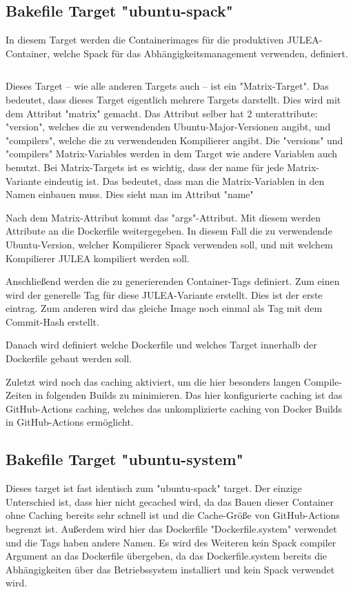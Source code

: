 \subsection{Bakefile Target "ubuntu-spack"}

In diesem Target werden die Containerimages für die produktiven JULEA-Container, welche Spack für das Abhängigkeitsmanagement verwenden, definiert.

\inputminted[firstline=9,lastline=33]{./lexers/docker-bake-lexer.py}{./code-examples/docker-bake.hcl}

Dieses Target – wie alle anderen Targets auch – ist ein "Matrix-Target". Das bedeutet, dass dieses Target eigentlich mehrere Targets darstellt. Dies wird mit dem Attribut "matrix" gemacht. Das Attribut selber hat 2 unterattribute: "version", welches die zu verwendenden Ubuntu-Major-Versionen angibt, und "compilers", welche die zu verwendenden Kompilierer angibt.
Die "versions" und "compilers" Matrix-Variables werden in dem Target wie andere Variablen auch benutzt. 
Bei Matrix-Targets ist es wichtig, dass der name für jede Matrix-Variante eindeutig ist. Das bedeutet, dass man die Matrix-Variablen in den Namen einbauen muss. Dies sieht man im Attribut "name"

Nach dem Matrix-Attribut kommt das "args"-Attribut. Mit diesem werden Attribute an die Dockerfile weitergegeben. In diesem Fall die zu verwendende Ubuntu-Version, welcher Kompilierer Spack verwenden soll, und mit welchem Kompilierer JULEA kompiliert werden soll. 

Anschließend werden die zu generierenden Container-Tags definiert. Zum einen wird der generelle Tag für diese JULEA-Variante erstellt. Dies ist der erste eintrag. Zum anderen wird das gleiche Image noch einmal als Tag mit dem Commit-Hash erstellt.

Danach wird definiert welche Dockerfile und welches Target innerhalb der Dockerfile gebaut werden soll. 

Zuletzt wird noch das caching aktiviert, um die hier besonders langen Compile-Zeiten in folgenden Builds zu minimieren. Das hier konfigurierte caching ist das GitHub-Actions caching, welches das unkomplizierte caching von Docker Builds in GitHub-Actions ermöglicht.

\subsection{Bakefile Target "ubuntu-system"}

Dieses target ist fast identisch zum "ubuntu-spack" target. Der einzige Unterschied ist, dass hier nicht gecached wird, da das Bauen dieser Container ohne Caching bereits sehr schnell ist und die Cache-Größe von GitHub-Actions begrenzt ist. Außerdem wird hier das Dockerfile "Dockerfile.system" verwendet und die Tags haben andere Namen. Es wird des Weiteren kein Spack compiler Argument an das Dockerfile übergeben, da das Dockerfile.system bereits die Abhängigkeiten über das Betriebssystem installiert und kein Spack verwendet wird. 

